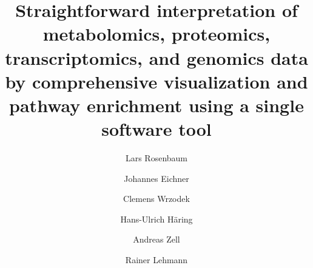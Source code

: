 \documentclass[final,5p,times,twocolumn]{elsarticle}
\begin{document}
\begin{frontmatter}



\title{Straightforward interpretation of metabolomics, proteomics, transcriptomics, and genomics data by comprehensive visualization and pathway enrichment using a single software tool}


\author[uni]{Lars Rosenbaum}
\author[uni]{Johannes Eichner}
\author[uni]{Clemens Wrzodek}
\author[endo,dzd]{Hans-Ulrich H\"aring}
\author[uni]{Andreas Zell}
\author[zentrallabor,idm,dzd]{Rainer Lehmann}
\address[uni]{Center for Bioinformatics, University of T\"ubingen, T\"ubingen, Germany}
\address[idm]{Institute for Diabetes Research and Metabolic Diseases of the Helmholtz Centre Munich at the University of T\"ubingen, T\"ubingen, Germany}
\address[endo]{Division of Endocrinology, Diabetology, Vascular Medicine, Nephrology and Clinical Chemistry, Department of Internal Medicine IV, University Hospital T\"ubingen, T\"ubingen, Germany}
\address[zentrallabor]{Division of Clinical Chemistry and Pathobiochemistry, Department of Internal Medicine IV, University Hospital T\"ubingen, T\"ubingen, Germany}
\address[dzd]{German Center for Diabetes Research (DZD), Germany}



\end{frontmatter}
\end{document}
